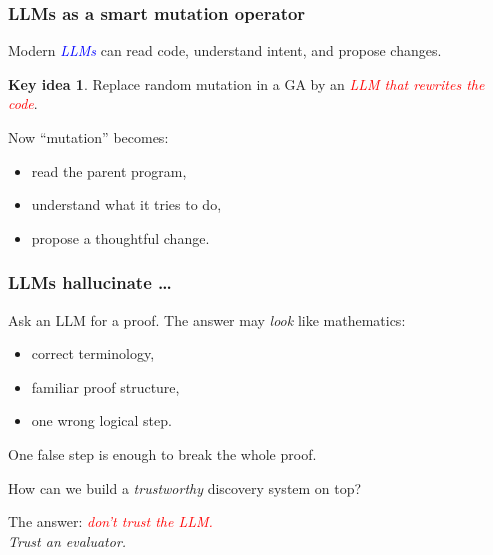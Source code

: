\documentclass{beamer}
\theoremstyle{definition}
\newtheorem*{KeyIdea}{Key idea}
\newcommand\remph[1]{\emph{\textcolor{red}{#1}}}
\newcommand\bemph[1]{\emph{\textcolor{blue}{#1}}}
\begin{document}

\begin{frame}
  \frametitle{LLMs as a smart mutation operator}
  Modern \bemph{LLMs} can read code, understand intent, and propose changes.
  \pause
  \vspace{.3cm}

  \begin{KeyIdea}
    Replace random mutation in a GA by an \remph{LLM that rewrites the code}.
  \end{KeyIdea}
  \pause
  \vspace{.3cm}

  Now ``mutation'' becomes:
  \begin{itemize}
    \item[$\bullet$] read the parent program,
    \item[$\bullet$] understand what it tries to do,
    \item[$\bullet$] propose a thoughtful change.
  \end{itemize}
\end{frame}


\begin{frame}
  \frametitle{LLMs hallucinate \ldots}
  \pause
  Ask an LLM for a proof. The answer may \emph{look} like mathematics:
  \pause
  \vspace{.2cm}

  \begin{itemize}
    \setlength{\itemsep}{.1cm}
    \item[$\bullet$] correct terminology,
    \pause
    \item[$\bullet$] familiar proof structure,
    \pause
    \item[$\bullet$] one wrong logical step.
  \end{itemize}
  \pause
  \vspace{.2cm}

  One false step is enough to break the whole proof.
  \pause
  \vspace{.3cm}

  How can we build a \emph{trustworthy} discovery system on top?
  \pause
  \vspace{.3cm}

  \begin{center}
    The answer: \remph{don't trust the LLM.} \\
    \pause
    \emph{Trust an evaluator.}
  \end{center}
\end{frame}
\end{document}
